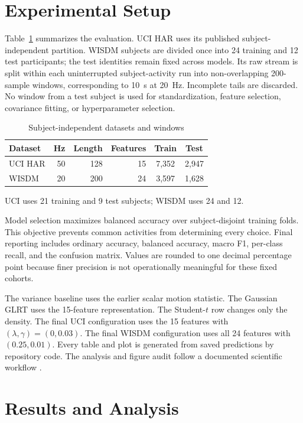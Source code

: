 \documentclass[a4paper,conference,10pt]{IEEEtran}
\begin{document}
\section{Experimental Setup}
Table~\ref{tab:data} summarizes the evaluation. UCI HAR uses its published subject-independent partition. WISDM subjects are divided once into 24 training and 12 test participants; the test identities remain fixed across models. Its raw stream is split within each uninterrupted subject-activity run into non-overlapping 200-sample windows, corresponding to 10~s at 20~Hz. Incomplete tails are discarded. No window from a test subject is used for standardization, feature selection, covariance fitting, or hyperparameter selection.

\begin{table}[t]
\caption{Subject-independent datasets and windows}
\label{tab:data}
\centering
\begin{tabular}{lrrrcc}
\toprule
Dataset & Hz & Length & Features & Train & Test \\
\midrule
UCI HAR & 50 & 128 & 15 & 7,352 & 2,947 \\
WISDM & 20 & 200 & 24 & 3,597 & 1,628 \\
\bottomrule
\end{tabular}
\vspace{2pt}
\footnotesize UCI uses 21 training and 9 test subjects; WISDM uses 24 and 12.
\end{table}

Model selection maximizes balanced accuracy over subject-disjoint training folds. This objective prevents common activities from determining every choice. Final reporting includes ordinary accuracy, balanced accuracy, macro F1, per-class recall, and the confusion matrix. Values are rounded to one decimal percentage point because finer precision is not operationally meaningful for these fixed cohorts.

The variance baseline uses the earlier scalar motion statistic. The Gaussian GLRT uses the 15-feature representation. The Student-$t$ row changes only the density. The final UCI configuration uses the 15 features with $(\lambda,\gamma)=(0,0.03)$. The final WISDM configuration uses all 24 features with $(0.25,0.01)$. Every table and plot is generated from saved predictions by repository code. The analysis and figure audit follow a documented scientific workflow \cite{kassis}.

\section{Results and Analysis}
\end{document}
